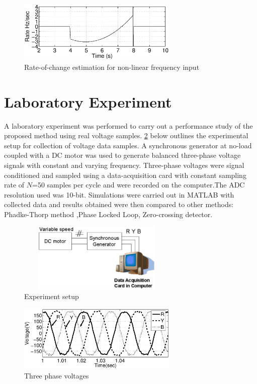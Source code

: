 \begin{figure}[!t]
\centering
\includegraphics[width=3.0in]{nonlink}
\caption{Rate-of-change estimation for non-linear frequency input}
\label{nonlink}
\end{figure}


\section{Laboratory Experiment}
A laboratory experiment was performed to carry out a performance study of the proposed method using real voltage samples. \figurename \ref{testbed} below outlines the experimental setup for collection of voltage data samples. A synchronous generator at no-load coupled with a DC motor was used to generate balanced three-phase voltage signals with constant and varying frequency. Three-phase voltages were signal conditioned and sampled using a data-acquisition card with constant sampling rate of $N$=50 samples per cycle and were recorded on the computer.The ADC resolution used was 10-bit. Simulations were carried out in MATLAB with collected data and results obtained were then compared to other methods: Phadke-Thorp method \cite{phadkethorp},Phase Locked Loop, Zero-crossing detector.

\begin{figure}[!t]
\centering
\includegraphics[height=1.3in,width=3.0in]{testbed}
\caption{Experiment setup}
\label{testbed}
\end{figure}

\begin{figure}[!t]
\centering
\includegraphics[width=3.0in]{rybvolt}
\caption{Three phase voltages}
\label{rybvolt}
\end{figure}

